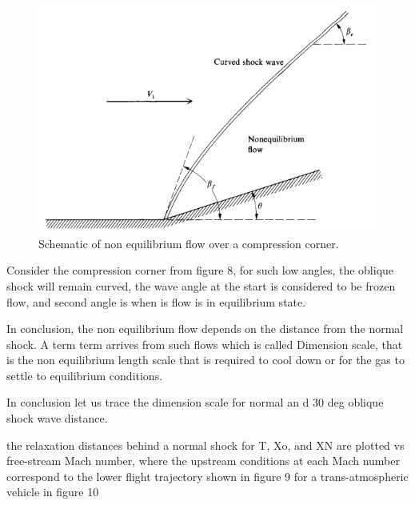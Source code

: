 \begin{figure}[ht]

\centering
  \includegraphics[width=0.7\linewidth]{images/compression_corner2.png}
  \caption{  Schematic of non equilibrium flow over a compression corner.}
  \label{fig:boat1}
\end{figure}

Consider the compression corner from figure 8, for such low angles, the oblique shock will remain curved, the wave angle at the start is considered to be frozen flow, and second angle is when is flow is in equilibrium state.

In conclusion, the non equilibrium flow depends on the distance from the normal shock. A term term arrives from such flows which is called Dimension scale, that is the non equilibrium length scale that is required to cool down or for the gas to settle to equilibrium conditions.

In conclusion let us trace the dimension scale for normal an d 30 deg oblique shock wave distance.

the relaxation distances behind a normal shock for T, Xo, and XN are
plotted vs free-stream Mach number, where the upstream conditions at each
Mach number correspond to the lower flight trajectory shown in figure 9 for a
trans-atmospheric vehicle in figure 10

